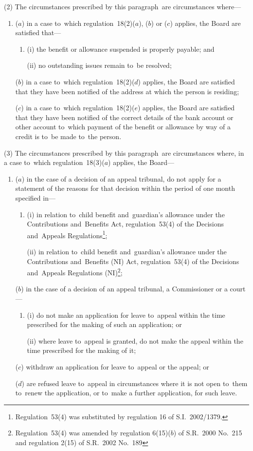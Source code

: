 \documentclass[12pt,a4paper]{article}
\begin{document}
(2) The circumstances prescribed by this paragraph~are circumstances where—
\begin{enumerate}\item[]
($a$) in a case to~which regulation~18(2)($a$), ($b$)  or ($c$)  applies, the Board are satisfied that—
\begin{enumerate}\item[]
(i) the benefit or allowance suspended is properly payable; and

(ii) no outstanding issues remain to~be resolved;
\end{enumerate}

($b$) in a case to~which regulation~18(2)($d$)  applies, the Board are satisfied that they have been notified of the address at which the person is residing;

($c$) in a case to~which regulation~18(2)($e$)  applies, the Board are satisfied that they have been notified of the correct details of the bank account or other account to~which payment of the benefit or allowance by way of a credit is to~be made to~the person.
\end{enumerate}

(3) The circumstances prescribed by this paragraph~are circumstances where, in a case to~which regulation~18(3)($a$)  applies, the Board—
\begin{enumerate}\item[]
($a$) in the case of a decision of an appeal tribunal, do not apply for a statement of the reasons for that decision within the period of one month specified in—
\begin{enumerate}\item[]
(i) in relation to~child benefit and~guardian’s allowance under the Contributions and~Benefits Act, regulation~53(4) of the Decisions and~Appeals Regulations\footnote{Regulation~53(4) was substituted by regulation 16 of S.I.~2002/1379.};

(ii) in relation to~child benefit and~guardian’s allowance under the Contributions and~Benefits (NI) Act, regulation~53(4) of the Decisions and~Appeals Regulations (NI)\footnote{Regulation~53(4) was amended by regulation 6(15)($b$) of S.R.~2000 No.~215 and regulation 2(15) of S.R.~2002 No.~189};
\end{enumerate}

($b$) in the case of a decision of an appeal tribunal, a Commissioner or a court—
\begin{enumerate}\item[]
(i) do not make an application for leave to~appeal within the time prescribed for the making of such an application; or

(ii) where leave to~appeal is granted, do not make the appeal within the time prescribed for the making of it;
\end{enumerate}

($c$) withdraw an application for leave to~appeal or the appeal; or

($d$) are refused leave to~appeal in circumstances where it is not open to~them to~renew the application, or to~make a further application, for such leave.
\end{enumerate}
\end{document}
